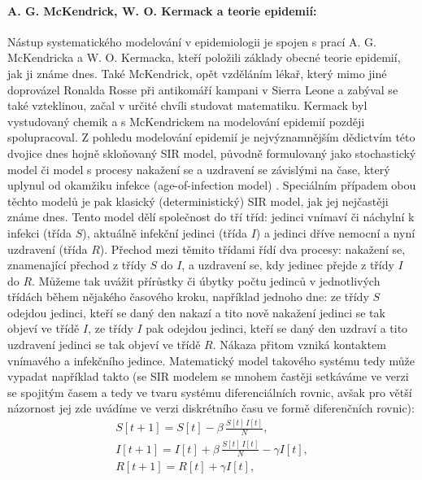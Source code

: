 
\paragraph{A. G. McKendrick, W. O. Kermack a teorie epidemií:} Nástup systematického modelování v epidemiologii je spojen s prací A. G. McKendricka a W. O. Kermacka, kteří položili základy obecné teorie epidemií, jak ji známe dnes. Také McKendrick, opět vzděláním lékař, který mimo jiné doprovázel Ronalda Rosse při antikomáří kampani v Sierra Leone a zabýval se také vzteklinou, začal v určité chvíli studovat matematiku. Kermack byl vystudovaný chemik a s McKendrickem na modelování epidemií později spolupracoval. Z pohledu modelování epidemií je nejvýznamnějším dědictvím této dvojice dnes hojně skloňovaný SIR model, původně formulovaný jako stochastický model \cite{McKendrick1925} či model s procesy nakažení se a uzdravení se závislými na čase, který uplynul od okamžiku infekce (age-of-infection model) \cite{McKendrickKermack1927,YangBrauer2008}. Speciálním případem obou těchto modelů je pak klasický (deterministický) SIR model, jak jej nejčastěji známe dnes. Tento model dělí společnost do tří tříd: jedinci vnímaví či náchylní k infekci (třída $S$), aktuálně infekční jedinci (třída $I$) a jedinci dříve nemocní a nyní uzdravení (třída $R$). Přechod mezi těmito třídami řídí dva procesy: nakažení se, znamenající přechod z třídy $S$ do $I$, a uzdravení se, kdy jedinec přejde z třídy $I$ do $R$. Můžeme tak uvážit přírůstky či úbytky počtu jedinců v jednotlivých třídách během nějakého časového kroku, například jednoho dne: ze třídy $S$ odejdou jedinci, kteří se daný den nakazí a tito nově nakažení jedinci se tak objeví ve třídě $I$, ze třídy $I$ pak odejdou jedinci, kteří se daný den uzdraví a tito uzdravení jedinci se tak objeví ve třídě $R$. Nákaza přitom vzniká kontaktem vnímavého a infekčního jedince. Matematický model takového systému tedy může vypadat například takto (se SIR modelem se mnohem častěji setkáváme ve verzi se spojitým časem a tedy ve tvaru systému diferenciálních rovnic, avšak pro větší názornost jej zde uvádíme ve verzi diskrétního času ve formě diferenčních rovnic):
\begin{equation}
\begin{array}{l}
\displaystyle{S[t+1] = S[t] - \beta \, \frac{S[t]\,I[t]}{N}}, \\[3ex]
\displaystyle{I[t+1] = I[t] + \beta \, \frac{S[t]\,I[t]}{N} - \gamma I[t]}, \\[3ex]
\displaystyle{R[t+1] = R[t] + \gamma I[t]},
\end{array}
\label{SIR1}
\end{equation}
